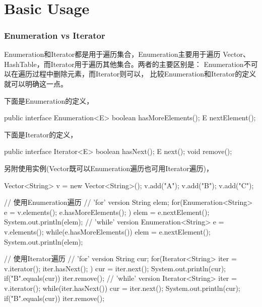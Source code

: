 \documentclass[a4paper,11pt]{article}
\begin{document}
\tt %
\pagestyle{header}
\sybmaketitle
\tableofcontents
\newpage

\pagestyle{main}
\setcounter{page}{1}

\part[Basic Usage]{Basic Usage}
\section[Enumeration vs Iterator]{Enumeration vs Iterator}
Enumeration和Iterator都是用于遍历集合，Enumeration主要用于遍历
Vector、HashTable，而Iterator用于遍历其他集合。两者的主要区别是：
Enumeration不可以在遍历过程中删除元素，而Iterator则可以，
比较Enumeration和Iterator的定义就可以明确这一点。

下面是Enumeration的定义，

\begin{javacode}
public interface Enumeration<E> {
  boolean hasMoreElements();
  E nextElement();
}
\end{javacode}

下面是Iterator的定义，

\begin{javacode}
public interface Iterator<E> {
  boolean hasNext();
  E next();
  void remove();
}
\end{javacode}

另附使用实例(Vector既可以Enumeration遍历也可用Iterator遍历)，

\begin{javacode}
Vector<String> v = new Vector<String>();
v.add("A");
v.add("B");
v.add("C");

// 使用Enumeration遍历
// 'for' version
String elem;
for(Enumeration<String> e = v.elements(); e.hasMoreElements(); ) {
  elem = e.nextElement();
  System.out.println(elem);
}
// 'while' version
Enumeration<String> e = v.elements();
while(e.hasMoreElements()) {
  elem = e.nextElement();
  System.out.println(elem);
}

// 使用Iterator遍历
// 'for' version
String cur;
for(Iterator<String> iter = v.iterator(); iter.hasNext(); ) {
  cur = iter.next();
  System.out.println(cur);
  if("B".equals(cur)) {
    iter.remove();
  }
}
// 'while' version
Iterator<String> iter = v.iterator();
while(iter.hasNext()) {
  cur = iter.next();
  System.out.println(cur);
  if("B".equals(cur)) {
    iter.remove();
  }
}
\end{javacode}
\end{document}
